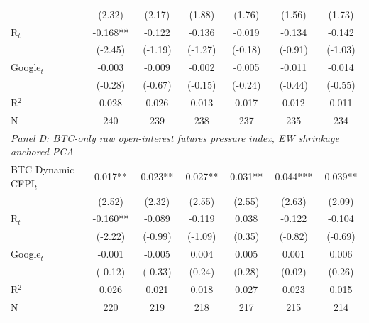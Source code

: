 \begin{table}[H]
{{\begin{tabular}{lcccccc}
 & (2.32) & (2.17) & (1.88) & (1.76) & (1.56) & (1.73) \\
R$_t$ & -0.168** & -0.122 & -0.136 & -0.019 & -0.134 & -0.142 \\
 & (-2.45) & (-1.19) & (-1.27) & (-0.18) & (-0.91) & (-1.03) \\
Google$_t$ & -0.003 & -0.009 & -0.002 & -0.005 & -0.011 & -0.014 \\
 & (-0.28) & (-0.67) & (-0.15) & (-0.24) & (-0.44) & (-0.55) \\
R$^2$ & 0.028 & 0.026 & 0.013 & 0.017 & 0.012 & 0.011 \\
N & 240 & 239 & 238 & 237 & 235 & 234 \\
\midrule
\multicolumn{7}{l}{\textit{Panel D: BTC-only raw open-interest futures pressure index, EW shrinkage anchored PCA}} \\
BTC Dynamic CFPI$_t$ & 0.017** & 0.023** & 0.027** & 0.031** & 0.044*** & 0.039** \\
 & (2.52) & (2.32) & (2.55) & (2.55) & (2.63) & (2.09) \\
R$_t$ & -0.160** & -0.089 & -0.119 & 0.038 & -0.122 & -0.104 \\
 & (-2.22) & (-0.99) & (-1.09) & (0.35) & (-0.82) & (-0.69) \\
Google$_t$ & -0.001 & -0.005 & 0.004 & 0.005 & 0.001 & 0.006 \\
 & (-0.12) & (-0.33) & (0.24) & (0.28) & (0.02) & (0.26) \\
R$^2$ & 0.026 & 0.021 & 0.018 & 0.027 & 0.023 & 0.015 \\
N & 220 & 219 & 218 & 217 & 215 & 214 \\
\bottomrule
\end{tabular}
}%
}
\vspace{0.35em}
\par\noindent{}
\end{table}
